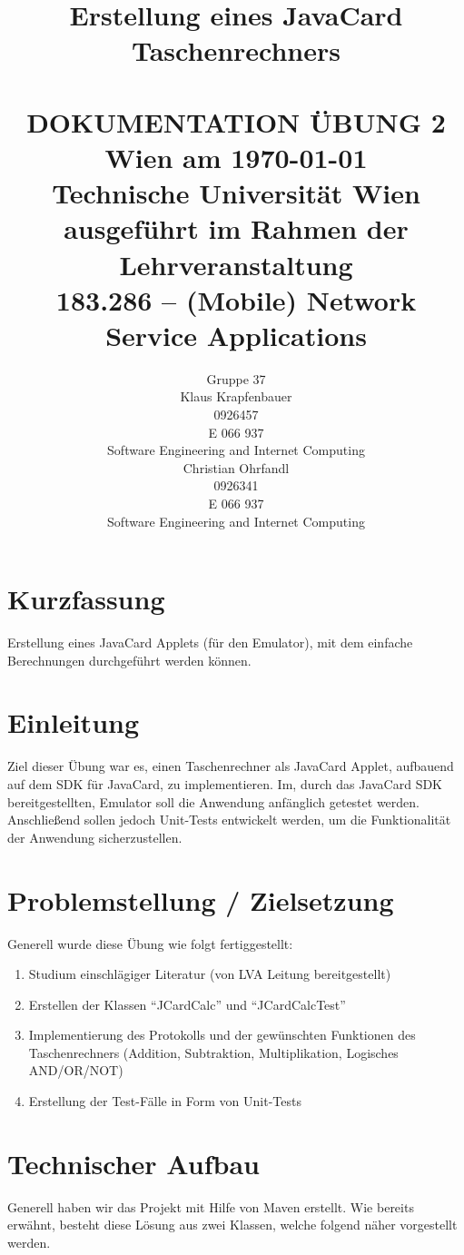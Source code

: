 \documentclass[paper=a4, fontsize=11pt]{scrartcl}
\title{	\normalsize Erstellung eines JavaCard Taschenrechners%
	\\[2.0cm] \HRule{0.5pt} \\
	\LARGE \textbf{\uppercase{Dokumentation Übung 2}} %
	\HRule{2pt} \\[1.5cm]
	\normalsize Wien am \today \\
	\normalsize Technische Universität Wien \\[1.0cm]
	\normalsize ausgeführt im Rahmen der Lehrveranstaltung \\
	\LARGE 183.286 – (Mobile) Network Service Applications
}
\author{
	Gruppe 37 \\[2.0cm]
	Klaus Krapfenbauer \\
	0926457 \\
	E 066 937 \\
	Software Engineering and Internet Computing \\[2.0cm]
	Christian Ohrfandl \\
	0926341 \\
	E 066 937 \\
	Software Engineering and Internet Computing \\[2.0cm]
}
\makeatletter
\def\printtitle{%
	{\centering \@title\par}}
\def\printauthor{%
	{\centering \normalsize \@author}}
\makeatother
\begin{document}
\thispagestyle{empty} %
\printtitle
	\vfill
\printauthor

\newpage
\tableofcontents

\newpage

\section{Kurzfassung}
Erstellung eines JavaCard Applets (für den Emulator), mit dem einfache Berechnungen durchgeführt werden können.

\section{Einleitung}
Ziel dieser Übung war es, einen Taschenrechner als JavaCard Applet, aufbauend auf dem SDK für JavaCard, zu implementieren. Im, durch das JavaCard SDK bereitgestellten, Emulator soll die Anwendung anfänglich getestet werden. Anschließend sollen jedoch Unit-Tests entwickelt werden, um die Funktionalität der Anwendung sicherzustellen.

\section{Problemstellung / Zielsetzung}
Generell wurde diese Übung wie folgt fertiggestellt:
\begin{enumerate}
\item Studium einschlägiger Literatur (von LVA Leitung bereitgestellt)
\item Erstellen der Klassen "`JCardCalc"' und "`JCardCalcTest"'
\item Implementierung des Protokolls und der gewünschten Funktionen des Taschenrechners (Addition, Subtraktion, Multiplikation, Logisches AND/OR/NOT)
\item Erstellung der Test-Fälle in Form von Unit-Tests
\end{enumerate}

\section{Technischer Aufbau}
Generell haben wir das Projekt mit Hilfe von Maven erstellt. Wie bereits erwähnt, besteht diese Lösung aus zwei Klassen, welche folgend näher vorgestellt werden.
\end{document}
